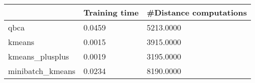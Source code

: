 \begin{table}[htbp]
\centering
\begin{tabular}{lll}
\toprule
 & Training time & #Distance computations \\
\midrule
qbca & 0.0459 & 5213.0000 \\
kmeans & 0.0015 & 3915.0000 \\
kmeans_plusplus & 0.0019 & 3195.0000 \\
minibatch_kmeans & 0.0234 & 8190.0000 \\
\bottomrule
\end{tabular}
\end{table}
